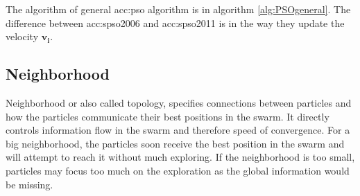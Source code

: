 The algorithm of general \acrshort{acc:pso} algorithm is in algorithm \ref{alg:PSOgeneral}. The difference between \acrshort{acc:spso2006} and \acrshort{acc:spso2011} is in the way they update the velocity $\mathbf{v_i}$.

\subsection{Neighborhood}
\label{chap:psoneig}

Neighborhood or also called topology, specifies connections between particles and how the particles communicate their best positions in the swarm. It directly controls information flow in the swarm and therefore speed of convergence. For a big neighborhood, the particles soon receive the best position in the swarm and will attempt to reach it without much exploring. If the neighborhood is too small, particles may focus too much on the exploration as the global information would be missing.

